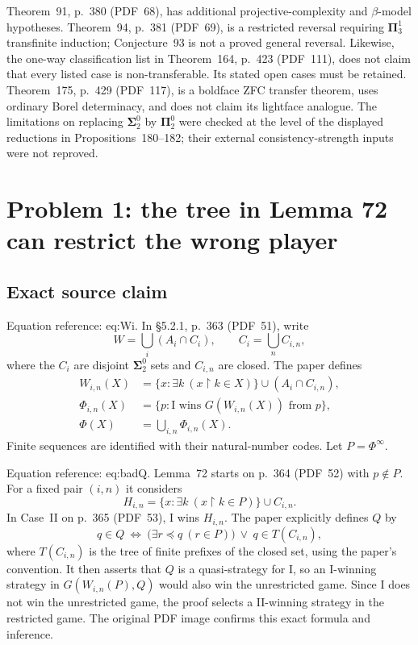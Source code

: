 \documentclass[10pt]{article}
\begin{document}
Theorem 91, p. 380 (PDF 68), has additional projective-complexity and \(\beta\)-model hypotheses. Theorem 94, p. 381 (PDF 69), is a restricted reversal requiring \(\boldsymbol{\Pi}^1_3\) transfinite induction; Conjecture 93 is not a proved general reversal. Likewise, the one-way classification list in Theorem 164, p. 423 (PDF 111), does not claim that every listed case is non-transferable. Its stated open cases must be retained. Theorem 175, p. 429 (PDF 117), is a boldface ZFC transfer theorem, uses ordinary Borel determinacy, and does not claim its lightface analogue. The limitations on replacing \(\boldsymbol{\Sigma}^0_2\) by \(\boldsymbol{\Pi}^0_2\) were checked at the level of the displayed reductions in Propositions 180–182; their external consistency-strength inputs were not reproved.\par
\section*{Problem 1: the tree in Lemma 72 can restrict the wrong player}
\subsection*{Exact source claim}
Equation reference: eq:Wi. In §5.2.1, p. 363 (PDF 51), write \[W=\bigcup_i(A_i\cap C_i),\qquad C_i=\bigcup_n C_{i,n},\] where the \(C_i\) are disjoint \(\boldsymbol{\Sigma}^0_2\) sets and \(C_{i,n}\) are closed. The paper defines \[\begin{aligned}
 W_{i,n}(X)&=\{x:\exists k\ (x\upharpoonright k\in X)\}
                 \cup(A_i\cap C_{i,n}),\\
 \Phi_{i,n}(X)&=\{p:\text{I wins }G(W_{i,n}(X))\text{ from }p\},\\
 \Phi(X)&=\bigcup_{i,n}\Phi_{i,n}(X).\end{aligned}\] Finite sequences are identified with their natural-number codes. Let \(P=\Phi^\infty\).\par
Equation reference: eq:badQ. Lemma 72 starts on p. 364 (PDF 52) with \(p\notin P\). For a fixed pair \((i,n)\) it considers \[H_{i,n}=\{x:\exists k\ (x\upharpoonright k\in P)\}\cup C_{i,n}.\] In Case II on p. 365 (PDF 53), I wins \(H_{i,n}\). The paper explicitly defines \(Q\) by \[
 q\in Q\ \Longleftrightarrow\
   \bigl(\exists r\preccurlyeq q\ (r\in P)\bigr)\ \lor\ q\in T(C_{i,n}),\] where \(T(C_{i,n})\) is the tree of finite prefixes of the closed set, using the paper’s convention. It then asserts that \(Q\) is a quasi-strategy for I, so an I-winning strategy in \(G(W_{i,n}(P),Q)\) would also win the unrestricted game. Since I does not win the unrestricted game, the proof selects a II-winning strategy in the restricted game. The original PDF image confirms this exact formula and inference.\par
\end{document}
